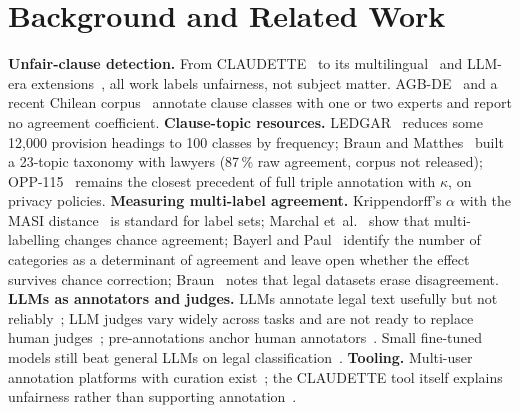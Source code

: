 \documentclass{IOS-Book-Article}
\newcommand{\corpus}{CLAUDETTE}
\begin{document}
\section{Background and Related Work}
\label{sec:related}
\textbf{Unfair-clause detection.} From \corpus{}~\cite{lippi2019claudette,lagioia2019deep,ruggeri2022memory} to its multilingual~\cite{drawzeski2021corpus,galassi2024multilingual} and LLM-era extensions~\cite{panarelli2025worth,frasheri2024llm}, all work labels unfairness, not subject matter. AGB-DE~\cite{braun2024agbde} and a recent Chilean corpus~\cite{loffler2025chilean} annotate clause classes with one or two experts and report no agreement coefficient. \textbf{Clause-topic resources.} LEDGAR~\cite{tuggener2020ledgar} reduces some 12,000 provision headings to 100 classes by frequency; Braun and Matthes~\cite{braun2022topics} built a 23-topic taxonomy with lawyers (87\,\% raw agreement, corpus not released); OPP-115~\cite{wilson2016opp115} remains the closest precedent of full triple annotation with $\kappa$, on privacy policies. \textbf{Measuring multi-label agreement.} Krippendorff's $\alpha$ with the MASI distance~\cite{krippendorff2018content,passonneau2006masi} is standard for label sets; Marchal et~al.~\cite{marchal2022multilabel} show that multi-labelling changes chance agreement; Bayerl and Paul~\cite{bayerl2011metaanalysis} identify the number of categories as a determinant of agreement and leave open whether the effect survives chance correction; Braun~\cite{braun2024differ} notes that legal datasets erase disagreement. \textbf{LLMs as annotators and judges.} LLMs annotate legal text usefully but not reliably~\cite{savelka2023unreasonable,schepers2025price,thalken2023legal}; LLM judges vary widely across tasks and are not ready to replace human judges~\cite{bavaresco2025judges}; pre-annotations anchor human annotators~\cite{choi2024llmeffect}. Small fine-tuned models still beat general LLMs on legal classification~\cite{chalkidis2020legalbert,thalken2023legal,dominguezolmedo2025lawma}. \textbf{Tooling.} Multi-user annotation platforms with curation exist~\cite{klie2018inception,pei2022potato}; the \corpus{} tool itself explains unfairness rather than supporting annotation~\cite{liepina2020claudettetool}.
\end{document}
